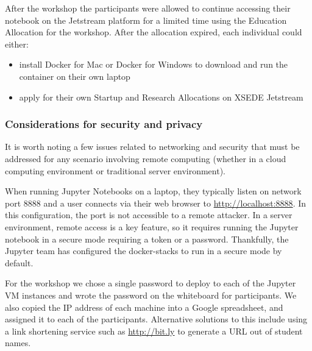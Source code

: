 After the workshop the participants were allowed to continue accessing their
notebook on the Jetstream platform for a limited time using the Education
Allocation for the workshop. After the allocation expired, each individual could
either:

\begin{itemize}

\item install Docker for Mac or Docker for Windows to download and run the
      container on their own laptop
\item apply for their own Startup and Research Allocations on XSEDE Jetstream

\end{itemize}

\subsubsection{Considerations for security and privacy}

It is worth noting a few issues related to networking and security that must be
addressed for any scenario involving remote computing (whether in a cloud
computing environment or traditional server environment).

When running Jupyter Notebooks on a laptop, they typically listen on network
port 8888 and a user connects via their web browser to
\url{http://localhost:8888}. In this configuration, the port is not accessible
to a remote attacker. In a server environment, remote access is a key
feature, so it requires running the Jupyter notebook in a secure mode requiring
a token or a password. Thankfully, the Jupyter team has configured the
docker-stacks to run in a secure mode by default.

For the workshop we chose a single password to deploy to each of the Jupyter VM
instances and wrote the password on the whiteboard for participants. We also
copied the IP address of each machine into a Google spreadsheet, and assigned it
to each of the participants. Alternative solutions to this include using a link
shortening service such as \url{http://bit.ly} to generate a URL out of student
names.
